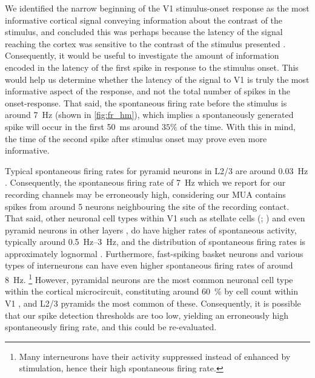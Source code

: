 We identified the narrow beginning of the \ac{V1} stimulus-onset response as the most informative cortical signal conveying information about the contrast of the stimulus, and concluded this was perhaps because the latency of the signal reaching the cortex was sensitive to the contrast of the stimulus presented \citep{Albrecht2002}.
Consequently, it would be useful to investigate the amount of information encoded in the latency of the first spike in response to the stimulus onset.
This would help us determine whether the latency of the signal to \ac{V1} is truly the most informative aspect of the response, and not the total number of spikes in the onset-response.
That said, the spontaneous firing rate before the stimulus is around \SI{7}{Hz} (shown in \autoref{fig:fr_hm}), which implies a spontaneously generated spike will occur in the first \SI{50}{\milli\second} around $35\%$ of the time.
With this in mind, the time of the second spike after stimulus onset may prove even more informative.

Typical spontaneous firing rates for pyramid neurons in \ac{L2/3} are around \SI{0.03}{Hz} \citep{Lutcke2015}.
Consequently, the spontaneous firing rate of \SI{7}{Hz} which we report for our recording channels may be erroneously high, considering our \ac{MUA} contains spikes from around \num{5} neurons neighbouring the site of the recording contact.
That said, other neuronal cell types within \ac{V1} such as stellate cells (\citealp{Iurilli2012}; \citealp{Iurilli2013}) and even pyramid neurons in other layers \citep{Manns2004,Dani2005,Maffei2006,Hromadka2008}, do have higher rates of spontaneous activity, typically around \SIrange{0.5}{3}{Hz}, and the distribution of spontaneous firing rates is approximately lognormal \citep{Mizuseki2017}.
Furthermore, fast-spiking basket neurons \citep{Chadderton2009} and various types of interneurons \citep{Hanganu2009,Lutcke2015} can have even higher spontaneous firing rates of around \SI{8}{Hz}.%
\footnote{Many interneurons have their activity suppressed instead of enhanced by stimulation, hence their high spontaneous firing rate.}
However, pyramidal neurons are the most common neuronal cell type within the cortical microcircuit, constituting around \SI{60}{\percent} by cell count within \ac{V1} \citep{Binzegger2004}, and \ac{L2/3} pyramids the most common of these.
Consequently, it is possible that our spike detection thresholds are too low, yielding an erroneously high spontaneously firing rate, and this could be re-evaluated.

